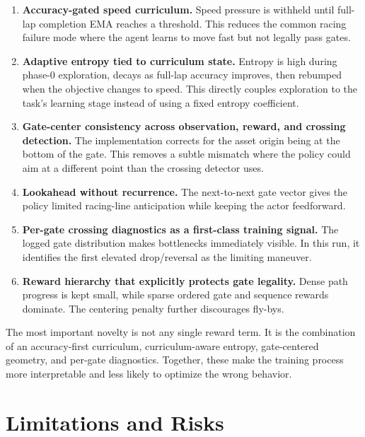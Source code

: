 \documentclass[11pt]{article}
\begin{document}
\begin{enumerate}
  \item \textbf{Accuracy-gated speed curriculum.} Speed pressure is withheld
  until full-lap completion EMA reaches a threshold. This reduces the common
  racing failure mode where the agent learns to move fast but not legally pass
  gates.

  \item \textbf{Adaptive entropy tied to curriculum state.} Entropy is high
  during phase-0 exploration, decays as full-lap accuracy improves, then rebumped
  when the objective changes to speed. This directly couples exploration to the
  task's learning stage instead of using a fixed entropy coefficient.

  \item \textbf{Gate-center consistency across observation, reward, and
  crossing detection.} The implementation corrects for the asset origin being
  at the bottom of the gate. This removes a subtle mismatch where the policy
  could aim at a different point than the crossing detector uses.

  \item \textbf{Lookahead without recurrence.} The next-to-next gate vector gives
  the policy limited racing-line anticipation while keeping the actor feedforward.

  \item \textbf{Per-gate crossing diagnostics as a first-class training signal.}
  The logged gate distribution makes bottlenecks immediately visible. In this
  run, it identifies the first elevated drop/reversal as the limiting maneuver.

  \item \textbf{Reward hierarchy that explicitly protects gate legality.}
  Dense path progress is kept small, while sparse ordered gate and sequence
  rewards dominate. The centering penalty further discourages fly-bys.
\end{enumerate}

The most important novelty is not any single reward term. It is the combination
of an accuracy-first curriculum, curriculum-aware entropy, gate-centered
geometry, and per-gate diagnostics. Together, these make the training process
more interpretable and less likely to optimize the wrong behavior.

\section{Limitations and Risks}
\end{document}
